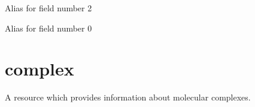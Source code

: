 \documentclass[letterpaper,10pt,english]{sphinxmanual}
\begin{document}
\begin{fulllineitems}
\begin{fulllineitems}
\label{\detokenize{reference:pypath.cellphonedb.CellPhoneDBProtein.transmembrane}}
Alias for field number 2

\end{fulllineitems}


\begin{fulllineitems}
\label{\detokenize{reference:pypath.cellphonedb.CellPhoneDBProtein.uniprot}}
Alias for field number 0

\end{fulllineitems}


\end{fulllineitems}



\section{complex}
\label{\detokenize{reference:module-pypath.complex}}\label{\detokenize{reference:complex}}

\begin{fulllineitems}
\label{\detokenize{reference:pypath.complex.AbstractComplexResource}}
A resource which provides information about molecular complexes.

\end{fulllineitems}


\begin{fulllineitems}
\label{\detokenize{reference:pypath.complex.CellPhoneDB}}
\end{fulllineitems}
\end{document}
